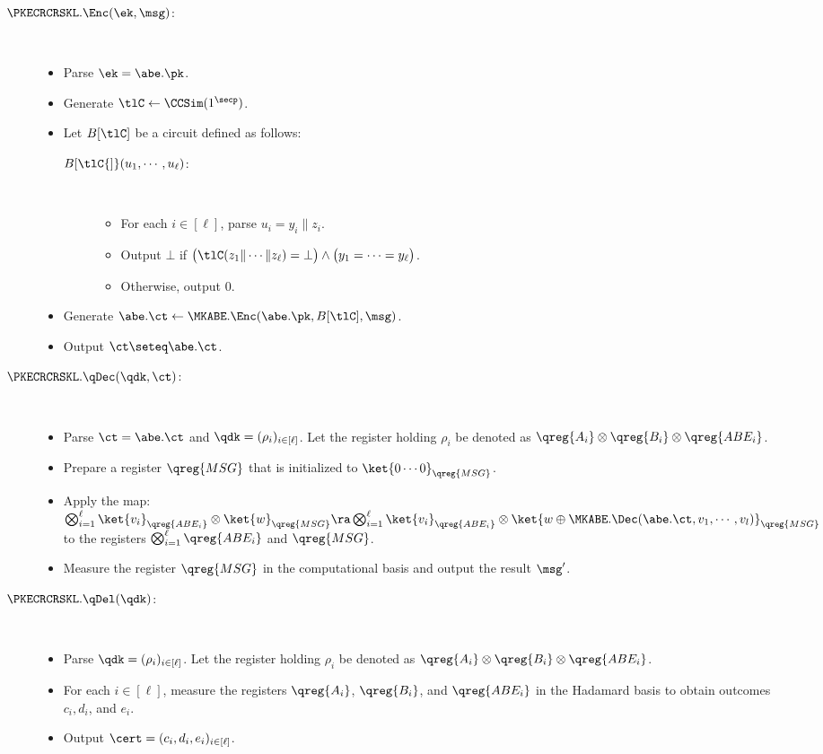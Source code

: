 \begin{description}
\item[$\PKECRCRSKL.\Enc(\ek,\msg)$:] $ $
\begin{itemize}
\item Parse $\ek=\abe.\pk$.
\item Generate $\tlC\gets\CCSim(1^\secp)$.
\item Let $B[\tlC]$ be a circuit defined as follows:
\begin{description}
\item[$B{[}\tlC{]}(u_1, \cdots, u_\ell)$:] $ $
\begin{itemize}
\item For each $i \in [\ell]$, parse $u_i = y_i \| z_i$.
\item Output $\bot$ if $\big(\tlC(z_1 \| \cdots \| z_\ell) =
\bot\big) \land \big(y_1 = \cdots = y_\ell\big)$.
\item Otherwise, output $0$.
\end{itemize}
\end{description}

\item Generate $\abe.\ct\gets\MKABE.\Enc(\abe.\pk,B[\tlC],\msg)$.
\item Output $\ct\seteq\abe.\ct$.
\end{itemize}

\item[$\PKECRCRSKL.\qDec(\qdk,\ct)$:] $ $
\begin{itemize}
\item Parse $\ct=\abe.\ct$ and $\qdk = (\rho_i)_{i \in [\ell]}$. Let
the register holding $\rho_i$ be denoted as $\qreg{A_i} \otimes
\qreg{B_i} \otimes \qreg{ABE_i}$. 
\item Prepare a register $\qreg{MSG}$ that is initialized to
$\ket{0\cdots0}_{\qreg{MSG}}$.

\item Apply the map:
$\bigotimes_{i=1}^{\ell}\ket{v_i}_{\qreg{ABE_i}}\otimes
\ket{w}_{\qreg{MSG}}\ra
\bigotimes_{i=1}^{\ell}\ket{v_i}_{\qreg{ABE_i}}\otimes\ket{w\oplus\MKABE.\Dec(\abe.\ct, v_1, \cdots, v_l)}_{\qreg{MSG}}$ to the registers
$\bigotimes_{i=1}^\ell\qreg{ABE_i}$ and $\qreg{MSG}$.
\item Measure the register $\qreg{MSG}$ in the computational basis
and output the result $\msg^\prime$.
\end{itemize}

\item[$\PKECRCRSKL.\qDel(\qdk)$:] $ $
\begin{itemize}
\item Parse $\qdk = (\rho_i)_{i \in [\ell]}$. Let the register 
holding $\rho_i$ be denoted as $\qreg{A_i} \otimes \qreg{B_i}
\otimes \qreg{ABE_i}$.
\item For each $i \in [\ell]$, measure the registers $\qreg{A_i}$,
$\qreg{B_i}$, and $\qreg{ABE_i}$ in the Hadamard basis to
obtain outcomes $c_i, d_i$, and $e_i$.
\item Output $\cert = (c_i, d_i, e_i)_{i \in [\ell]}$.
\end{itemize}


\end{description}
